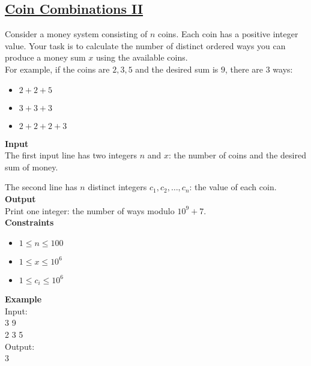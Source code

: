 \subsection{\href{https://cses.fi/problemset/task/1636}{Coin Combinations II}}

Consider a money system consisting of $n$ coins. Each coin has a positive integer value. Your task is to calculate the number of distinct ordered ways you can produce a money sum $x$ using the available coins.\\
\hfill \break
For example, if the coins are ${2,3,5}$ and the desired sum is $9$, there are $3$ ways:

\begin{itemize}[noitemsep]
    \item $2+2+5$
    \item $3+3+3$
    \item $2+2+2+3$
\end{itemize}

\textbf{Input}\\
The first input line has two integers $n$ and $x$: the number of coins and the desired sum of money.

The second line has $n$ distinct integers $c_1,c_2,…,c_n$: the value of each coin.\\
\hfill \break
\textbf{Output}\\
Print one integer: the number of ways modulo $10^9+7$.\\
\hfill \break
\textbf{Constraints}\\
\begin{itemize}[noitemsep]
    \item $1 \leq n \leq 100 $
    \item $1 \leq x \leq 10^6 $
    \item $1 \leq c_i \leq 10^6 $
\end{itemize}
\textbf{Example}\\
Input:\\
3 9\\
2 3 5\\
\hfill \break
Output:\\
3